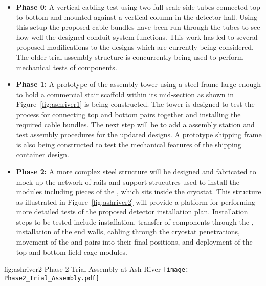 \begin{itemize}
  \item {\bf Phase 0:} A vertical cabling test using two full-scale 
          side tubes connected top to bottom and mounted 
         against a vertical column in the detector hall.  Using this 
         setup the proposed cable bundles have been run through the 
         tubes to see how well the designed conduit system functions.
         This work has led to several proposed modifications to the 
         designs which are currently being considered.  The older 
          trial assembly structure is concurrently 
         being used to perform mechanical tests of  
         components. 
  \item {\bf Phase 1:} A prototype of the   
         assembly tower using a steel frame large enough to hold a 
         commercial stair scaffold within its mid-section as shown 
         in Figure~\ref{fig:ashriver1} is being constructed.  The 
         tower is designed to test the process for connecting top 
         and bottom  pairs together and installing the 
         required cable bundles.  The next step will be to add a
          assembly station and test assembly procedures 
         for the updated  designs.  A prototype 
          shipping frame is also being constructed to 
         test the mechanical features of the shipping container 
         design.  
  \item {\bf Phase 2:} A more complex steel structure will be 
         designed and fabricated to mock up the network of rails 
         and support strucutres used to install the 
          modules including pieces of the , 
         which sits inside the cryostat.  This structure as 
         illustrated in Figure~\ref{fig:ashriver2} will provide 
         a platform for performing more detailed tests of the 
         proposed detector installation plan.  Installation steps 
         to be tested include  installation, transfer 
         of  components through the , 
         installation of the  end walls, cabling 
         through the cryostat penetrations, movement of the 
          and   pairs into their final 
         positions, and deployment of the top and bottom field 
         cage modules.
\end{itemize}
\begin{dunefigure}{fig:ashriver2}
  {Phase 2 Trial Assembly at Ash River}
  \texttt{[image: Phase2\_Trial\_Assembly.pdf]}
\end{dunefigure}

